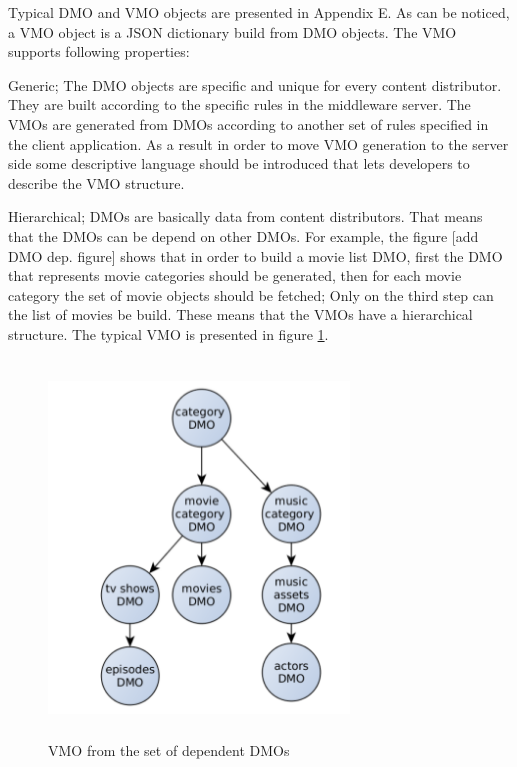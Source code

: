 
Typical DMO and VMO objects are presented in Appendix E. As can be noticed, a VMO object is a JSON dictionary build from DMO objects. The VMO supports following properties:

Generic; The DMO objects are specific and unique for every content distributor. They are built according to the specific rules in the middleware server. The VMOs are generated from DMOs according to another set of rules specified in the client application. As a result in order to move VMO generation to the server side some descriptive language should be introduced that lets developers to describe the VMO structure.

Hierarchical; DMOs are basically data from content distributors. That means that the DMOs can be depend on other DMOs. For example, the figure [add DMO dep. figure] shows that in order to build a movie list DMO, first the DMO that represents movie categories should be generated, then for each movie category the set of movie objects should be fetched; Only on the third step can the list of movies be build. These means that the VMOs have a hierarchical structure. The typical VMO is presented in figure \ref{fig:vmo_example}.

\begin{figure}[h]
    \centering
	\includegraphics[width=8cm,height=10cm,keepaspectratio]{images/vmo_example.png}
    \caption{VMO from the set of dependent DMOs}
    \label{fig:vmo_example}
\end{figure} 

